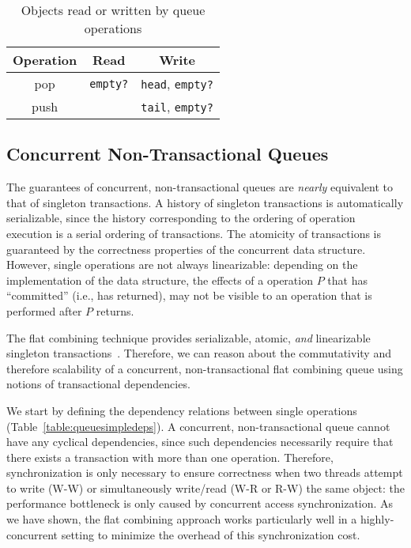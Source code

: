 \begin{table}[t]
\centering
\begin{tabular}{c||c|c}
    Operation & Read & Write\\
    \hline
    pop & \texttt{empty?} & \texttt{head}, \texttt{empty?}\\
    push & & \texttt{tail}, \texttt{empty?}\\
\end{tabular}
    \caption{Objects read or written by queue operations}
    \label{table:qrw}
\end{table}

\subsection{Concurrent Non-Transactional Queues}

The guarantees of concurrent, non-transactional queues are \emph{nearly} equivalent to that of singleton transactions. A history of singleton transactions is automatically serializable, since the history corresponding to the ordering of operation execution is a serial ordering of transactions. The atomicity of transactions is guaranteed by the correctness properties of the concurrent data structure. However, single operations are not always linearizable: depending on the implementation of the data structure, the effects of a operation $P$ that has ``committed'' (i.e., has returned), may not be visible to an operation that is performed after $P$ returns.

The flat combining technique provides serializable, atomic, \emph{and} linearizable singleton transactions~\cite{flatcombining}. Therefore, we can reason about the commutativity and therefore scalability of a concurrent, non-transactional flat combining queue using notions of transactional dependencies.

We start by defining the dependency relations between single operations (Table~\ref{table:queuesimpledeps}). A concurrent, non-transactional queue cannot have any cyclical dependencies, since such dependencies necessarily require that there exists a transaction with more than one operation. Therefore, synchronization is only necessary to ensure correctness when two threads attempt to write (W-W) or simultaneously write/read (W-R or R-W) the same object: the performance bottleneck is only caused by concurrent access synchronization. As we have shown, the flat combining approach works particularly well in a highly-concurrent setting to minimize the overhead of this synchronization cost.

